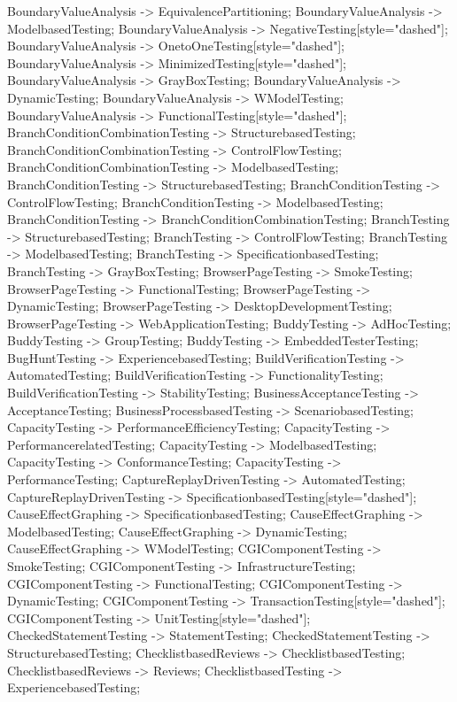 \documentclass{article}
\begin{document}
{BoundaryValueAnalysis -> EquivalencePartitioning;
BoundaryValueAnalysis -> ModelbasedTesting;
BoundaryValueAnalysis -> NegativeTesting[style="dashed"];
BoundaryValueAnalysis -> OnetoOneTesting[style="dashed"];
BoundaryValueAnalysis -> MinimizedTesting[style="dashed"];
BoundaryValueAnalysis -> GrayBoxTesting;
BoundaryValueAnalysis -> DynamicTesting;
BoundaryValueAnalysis -> WModelTesting;
BoundaryValueAnalysis -> FunctionalTesting[style="dashed"];
BranchConditionCombinationTesting -> StructurebasedTesting;
BranchConditionCombinationTesting -> ControlFlowTesting;
BranchConditionCombinationTesting -> ModelbasedTesting;
BranchConditionTesting -> StructurebasedTesting;
BranchConditionTesting -> ControlFlowTesting;
BranchConditionTesting -> ModelbasedTesting;
BranchConditionTesting -> BranchConditionCombinationTesting;
BranchTesting -> StructurebasedTesting;
BranchTesting -> ControlFlowTesting;
BranchTesting -> ModelbasedTesting;
BranchTesting -> SpecificationbasedTesting;
BranchTesting -> GrayBoxTesting;
BrowserPageTesting -> SmokeTesting;
BrowserPageTesting -> FunctionalTesting;
BrowserPageTesting -> DynamicTesting;
BrowserPageTesting -> DesktopDevelopmentTesting;
BrowserPageTesting -> WebApplicationTesting;
BuddyTesting -> AdHocTesting;
BuddyTesting -> GroupTesting;
BuddyTesting -> EmbeddedTesterTesting;
BugHuntTesting -> ExperiencebasedTesting;
BuildVerificationTesting -> AutomatedTesting;
BuildVerificationTesting -> FunctionalityTesting;
BuildVerificationTesting -> StabilityTesting;
BusinessAcceptanceTesting -> AcceptanceTesting;
BusinessProcessbasedTesting -> ScenariobasedTesting;
CapacityTesting -> PerformanceEfficiencyTesting;
CapacityTesting -> PerformancerelatedTesting;
CapacityTesting -> ModelbasedTesting;
CapacityTesting -> ConformanceTesting;
CapacityTesting -> PerformanceTesting;
CaptureReplayDrivenTesting -> AutomatedTesting;
CaptureReplayDrivenTesting -> SpecificationbasedTesting[style="dashed"];
CauseEffectGraphing -> SpecificationbasedTesting;
CauseEffectGraphing -> ModelbasedTesting;
CauseEffectGraphing -> DynamicTesting;
CauseEffectGraphing -> WModelTesting;
CGIComponentTesting -> SmokeTesting;
CGIComponentTesting -> InfrastructureTesting;
CGIComponentTesting -> FunctionalTesting;
CGIComponentTesting -> DynamicTesting;
CGIComponentTesting -> TransactionTesting[style="dashed"];
CGIComponentTesting -> UnitTesting[style="dashed"];
CheckedStatementTesting -> StatementTesting;
CheckedStatementTesting -> StructurebasedTesting;
ChecklistbasedReviews -> ChecklistbasedTesting;
ChecklistbasedReviews -> Reviews;
ChecklistbasedTesting -> ExperiencebasedTesting;
}
\end{document}
